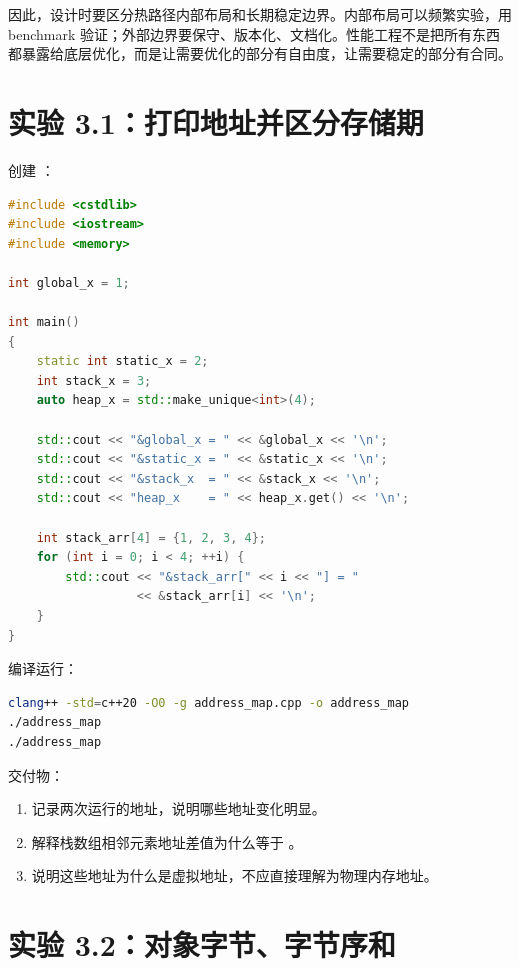 因此，设计时要区分热路径内部布局和长期稳定边界。内部布局可以频繁实验，用 benchmark 验证；外部边界要保守、版本化、文档化。性能工程不是把所有东西都暴露给底层优化，而是让需要优化的部分有自由度，让需要稳定的部分有合同。

\section{实验 3.1：打印地址并区分存储期}

\begin{labbox}
创建 ：

\begin{lstlisting}[language=C++]
#include <cstdlib>
#include <iostream>
#include <memory>

int global_x = 1;

int main()
{
    static int static_x = 2;
    int stack_x = 3;
    auto heap_x = std::make_unique<int>(4);

    std::cout << "&global_x = " << &global_x << '\n';
    std::cout << "&static_x = " << &static_x << '\n';
    std::cout << "&stack_x  = " << &stack_x << '\n';
    std::cout << "heap_x    = " << heap_x.get() << '\n';

    int stack_arr[4] = {1, 2, 3, 4};
    for (int i = 0; i < 4; ++i) {
        std::cout << "&stack_arr[" << i << "] = "
                  << &stack_arr[i] << '\n';
    }
}
\end{lstlisting}

编译运行：

\begin{lstlisting}[language=bash]
clang++ -std=c++20 -O0 -g address_map.cpp -o address_map
./address_map
./address_map
\end{lstlisting}

交付物：

\begin{enumerate}
  \item 记录两次运行的地址，说明哪些地址变化明显。
  \item 解释栈数组相邻元素地址差值为什么等于 。
  \item 说明这些地址为什么是虚拟地址，不应直接理解为物理内存地址。
\end{enumerate}
\end{labbox}

\section{实验 3.2：对象字节、字节序和 }

